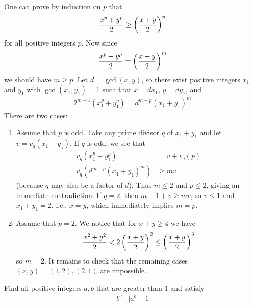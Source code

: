     \begin{solution}
        One can prove by induction on $p$ that
        	\begin{align*}
        		\frac{x^p+y^p}2\ge \left(\frac{x+y}2\right)^p
        	\end{align*}
        for all positive integers $p$. Now since
        	\begin{align*}
        		\frac{x^p+y^p}{2}= \left(\frac{x+y}{2}\right)^m
        	\end{align*}
        we should have $ m \geq p$. Let $d=\gcd(x,y)$, so there exist positive integers
        $x_1$ and $y_1$ with $\gcd(x_1,y_1)=1$ such that $x=dx_1$, $y=dy_1$, and
        	\begin{align*}
        		2^{m-1}(x_1^p+y_1^p)=d^{m-p}(x_1+y_1)^m
        	\end{align*}
        There are two cases:

        \begin{enumerate}
        	\item Assume that $p$ is odd. Take any prime divisor $q$ of $x_1+y_1$ and let $v=v_q(x_1+y_1)$. If $q$ is odd, we see that
        		\begin{align*}
        			v_q(x_1^p +y_1^p)
        				& =v+v_q(p)\\
        			v_q(d^{m-p}(x_1+y_1)^m)
        				& \geq mv
        		\end{align*}
        	(because $q$  may also be a factor of $d$).
        	Thus $m\le 2$ and $p\le 2$, giving an immediate contradiction. If $q=2$, then $m-1+v\ge mv$, so $v\le 1$ and $x_1+y_1=2$, i.e., $x=y$, which immediately implies $m=p$.

        	\item Assume that $p=2$. We notice that for $x+y \geq 4$ we have
        		\begin{align*}
        			\frac{x^2+y^2}2< 2\left(\frac{x+y}2\right)^2\le \left(\frac{x+y}2\right)^3
        		\end{align*}
        	so $m=2$. It remains to check that the remaining cases $(x,y)=(1,2),(2,1)$ are impossible.
        \end{enumerate}

    \end{solution}

    \begin{problem}
        Find all positive integers $a,b$ that are greater than $1$ and satisfy
        	\begin{align*}
	        	b^a
	        		& \mid a^b-1
        	\end{align*}
    \end{problem}

